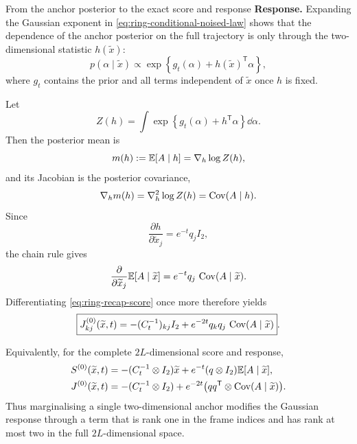 \begin{toolbox}{From the anchor posterior to the exact
score and response}
\medskip
\noindent\textbf{Response.}
Expanding the Gaussian exponent in
\eqref{eq:ring-conditional-noised-law} shows that the dependence of the
anchor posterior on the full trajectory is only through the two-dimensional
statistic $h(\widetilde x)$:
\begin{equation}
  p(\alpha\mid\widetilde x)
  \propto
  \exp\!\left\{
    g_t(\alpha)+h(\widetilde x)^{\mathsf T}\alpha
  \right\},
  \label{eq:ring-anchor-posterior}
\end{equation}
where $g_t$ contains the prior and all terms independent of
$\widetilde x$ once $h$ is fixed.

Let
\[
  Z(h)=\int
  \exp\!\left\{g_t(\alpha)+h^{\mathsf T}\alpha\right\}
  \dd\alpha .
\]
Then the posterior mean is
\[
  m(h)
  :=
  \mathbb{E}[A\mid h]
  =
  \nabla_h\log Z(h),
\]
and its Jacobian is the posterior covariance,
\begin{equation}
  \nabla_h m(h)
  =
  \nabla_h^2\log Z(h)
  =
  \operatorname{Cov}(A\mid h).
  \label{eq:ring-mean-covariance-identity}
\end{equation}
Since
\[
  \frac{\partial h}{\partial\widetilde x_j}
  =
  e^{-t}q_j I_2,
\]
the chain rule gives
\begin{equation}
  \frac{\partial}{\partial\widetilde x_j}
  \mathbb{E}[A\mid\widetilde x]
  =
  e^{-t}q_j\,\operatorname{Cov}(A\mid\widetilde x).
  \label{eq:ring-anchor-response}
\end{equation}
Differentiating \eqref{eq:ring-recap-score} once more therefore yields
\begin{equation}
  \boxed{
  J_{kj}^{(0)}(\widetilde x,t)
  =
  -(C_t^{-1})_{kj}I_2
  +
  e^{-2t}q_kq_j\,
  \operatorname{Cov}(A\mid\widetilde x)
  }.
\end{equation}

Equivalently, for the complete $2L$-dimensional score and response,
\begin{align}
  S^{(0)}(\widetilde x,t)
  &=
  -(C_t^{-1}\otimes I_2)\widetilde x
  +e^{-t}(q\otimes I_2)\mathbb{E}[A\mid\widetilde x],
  \label{eq:ring-score-vector-form}\\
  J^{(0)}(\widetilde x,t)
  &=
  -(C_t^{-1}\otimes I_2)
  +e^{-2t}
   \bigl(qq^{\mathsf T}\otimes
   \operatorname{Cov}(A\mid\widetilde x)\bigr).
  \label{eq:ring-response-vector-form}
\end{align}
Thus marginalising a single two-dimensional anchor modifies the Gaussian
response through a term that is rank one in the frame indices and has rank at
most two in the full $2L$-dimensional space.
\end{toolbox}

